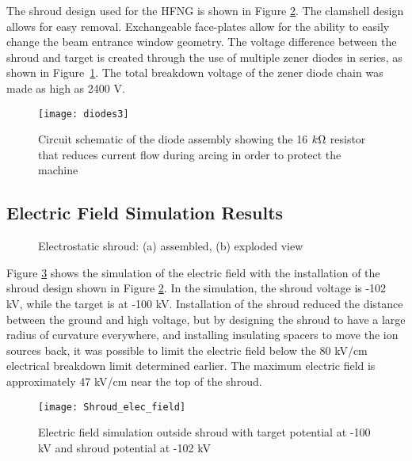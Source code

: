 \documentclass[aps,prstab,twocolumn,superscriptaddress]{revtex4-1}
\begin{document}
The shroud design used for the HFNG is shown in Figure \ref{fig:shroud}. The clamshell design allows for easy removal.  Exchangeable face-plates allow for the ability to easily change the beam entrance window geometry. The voltage difference between the shroud and target is created through the use of multiple zener diodes in series, as shown in Figure~\ref{fig:diodes}. The total breakdown voltage of the zener diode chain was made as high as 2400 V.

\begin{figure}
	\centering
	\texttt{[image: diodes3]}
	\caption{Circuit schematic of the diode assembly showing the 16 $k\ohm$ resistor that reduces current flow during arcing in order to protect the machine}
	\label{fig:diodes}
\end{figure}

\subsection{Electric Field Simulation Results}

\begin{figure}
	\hfill
	\caption{Electrostatic shroud: (a) assembled, (b) exploded view}
	\label{fig:shroud}
\end{figure}

Figure \ref{fig:shroud_e_field} shows the simulation of the electric field with the installation of the shroud design shown in Figure \ref{fig:shroud}. In the simulation, the shroud voltage is -102 kV, while the target is at -100 kV. Installation of the shroud reduced the distance between the ground and high voltage, but by designing the shroud to have a large radius of curvature everywhere, and installing insulating spacers to move the ion sources back, it was possible to limit the electric field below the 80 kV/cm electrical breakdown limit determined earlier. The maximum electric field is approximately 47 kV/cm near the top of the shroud.

\begin{figure}
	\centering
	\texttt{[image: Shroud\_elec\_field]}
	\caption{Electric field simulation outside shroud with target potential at -100 kV and shroud potential at -102 kV}
	\label{fig:shroud_e_field}
\end{figure}
\end{document}
